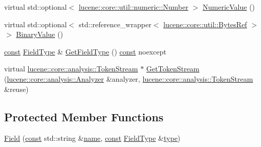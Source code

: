 \begin{DoxyCompactItemize}
\item 
virtual std\+::optional$<$ \mbox{\hyperlink{classlucene_1_1core_1_1util_1_1numeric_1_1Number}{lucene\+::core\+::util\+::numeric\+::\+Number}} $>$ \mbox{\hyperlink{classlucene_1_1core_1_1document_1_1Field_a858814043215c98bacf6ecc823d078ea}{Numeric\+Value}} ()
\item 
virtual std\+::optional$<$ std\+::reference\+\_\+wrapper$<$ \mbox{\hyperlink{classlucene_1_1core_1_1util_1_1BytesRef}{lucene\+::core\+::util\+::\+Bytes\+Ref}} $>$ $>$ \mbox{\hyperlink{classlucene_1_1core_1_1document_1_1Field_adf4cc37537f8889dda2469c22481193b}{Binary\+Value}} ()
\item 
\mbox{\hyperlink{ZlibCrc32_8h_a2c212835823e3c54a8ab6d95c652660e}{const}} \mbox{\hyperlink{classlucene_1_1core_1_1document_1_1FieldType}{Field\+Type}} \& \mbox{\hyperlink{classlucene_1_1core_1_1document_1_1Field_a06bffb93596bfbe170e795279d30ae4f}{Get\+Field\+Type}} () \mbox{\hyperlink{ZlibCrc32_8h_a2c212835823e3c54a8ab6d95c652660e}{const}} noexcept
\item 
virtual \mbox{\hyperlink{classlucene_1_1core_1_1analysis_1_1TokenStream}{lucene\+::core\+::analysis\+::\+Token\+Stream}} $\ast$ \mbox{\hyperlink{classlucene_1_1core_1_1document_1_1Field_aa3d6b7ab7cb42820491c036872190317}{Get\+Token\+Stream}} (\mbox{\hyperlink{classlucene_1_1core_1_1analysis_1_1Analyzer}{lucene\+::core\+::analysis\+::\+Analyzer}} \&analyzer, \mbox{\hyperlink{classlucene_1_1core_1_1analysis_1_1TokenStream}{lucene\+::core\+::analysis\+::\+Token\+Stream}} \&reuse)
\end{DoxyCompactItemize}
\subsection*{Protected Member Functions}
\begin{DoxyCompactItemize}
\item 
\mbox{\hyperlink{classlucene_1_1core_1_1document_1_1Field_a84a767b968d36093ab2243ae64499e8b}{Field}} (\mbox{\hyperlink{ZlibCrc32_8h_a2c212835823e3c54a8ab6d95c652660e}{const}} std\+::string \&\mbox{\hyperlink{classlucene_1_1core_1_1document_1_1Field_a52f673f3b3abb14b180f5159f4726537}{name}}, \mbox{\hyperlink{ZlibCrc32_8h_a2c212835823e3c54a8ab6d95c652660e}{const}} \mbox{\hyperlink{classlucene_1_1core_1_1document_1_1FieldType}{Field\+Type}} \&\mbox{\hyperlink{classlucene_1_1core_1_1document_1_1Field_a7d5849d933ebde73422710069643ccff}{type}})
\end{DoxyCompactItemize}
